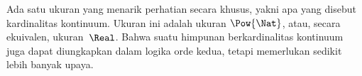 \documentclass[../../../include/open-logic-section]{subfiles}
\begin{document}
Ada satu ukuran yang menarik perhatian secara khusus, yakni apa yang disebut
kardinalitas kontinuum. Ukuran ini adalah ukuran $\Pow{\Nat}$, atau, secara
ekuivalen, ukuran~$\Real$. Bahwa suatu himpunan berkardinalitas kontinuum juga
dapat diungkapkan dalam logika orde kedua, tetapi memerlukan
sedikit lebih banyak upaya.
\end{document}
